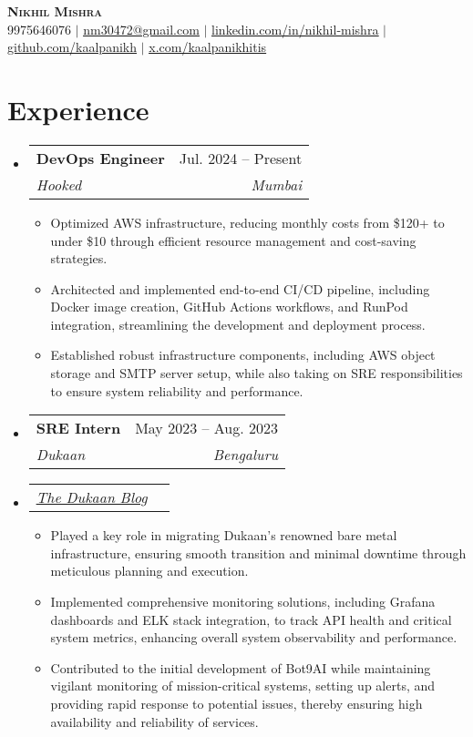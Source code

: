 \documentclass[letterpaper,11pt]{article}
\makeatletter
\newcommand{\resumeItem}[1]{
  \item\small{
    {#1 \vspace{-2pt}}
  }
}
\newcommand{\resumeSubheading}[4]{
  \vspace{-2pt}\item
    \begin{tabular*}{0.97\textwidth}[t]{l@{\extracolsep{\fill}}r}
      \textbf{#1} & #2 \\
      \textit{\small#3} & \textit{\small #4} \\
    \end{tabular*}\vspace{-7pt}
}
\newcommand{\resumeSubSubheading}[2]{
    \item
    \begin{tabular*}{0.97\textwidth}{l@{\extracolsep{\fill}}r}
      \textit{\small#1} & \textit{\small #2} \\
    \end{tabular*}\vspace{-7pt}
}
\newcommand{\resumeSubHeadingListStart}{\begin{itemize}[leftmargin=0.15in, label={}]}
\newcommand{\resumeSubHeadingListEnd}{\end{itemize}}
\newcommand{\resumeItemListStart}{\begin{itemize}}
\newcommand{\resumeItemListEnd}{\end{itemize}\vspace{-5pt}}
\makeatother
\begin{document}

\begin{center}
    \textbf{\Huge \scshape Nikhil Mishra} \\ \vspace{1pt}
    \small  9975646076 $|$ \href{mailto:nm30472@gmail.com}{\underline{nm30472@gmail.com}} $|$ 
    \href{https://linkedin.com/in/nikhil-mishra-392503306}{\underline{linkedin.com/in/nikhil-mishra}} $|$
    \href{https://github.com/kaalpanikh}{\underline{github.com/kaalpanikh}} $|$
    \href{https://x.com/kaalpanikhitis}{\underline{x.com/kaalpanikhitis}}
\end{center}

\section{Experience}
  \resumeSubHeadingListStart
    \resumeSubheading
      {DevOps Engineer}{Jul. 2024 -- Present}
      {Hooked}{Mumbai}
      \resumeItemListStart
        \resumeItem{Optimized AWS infrastructure, reducing monthly costs from \$120+ to under \$10 through efficient resource management and cost-saving strategies.}
        \resumeItem{Architected and implemented end-to-end CI/CD pipeline, including Docker image creation, GitHub Actions workflows, and RunPod integration, streamlining the development and deployment process.}
        \resumeItem{Established robust infrastructure components, including AWS object storage and SMTP server setup, while also taking on SRE responsibilities to ensure system reliability and performance.}
      \resumeItemListEnd
    
    \resumeSubheading
      {SRE Intern}{May 2023 -- Aug. 2023}
      {Dukaan}{Bengaluru}
    \resumeSubSubheading
      {\href{https://dukaan.nikhilmishra.live}{\underline{The Dukaan Blog}}}{}
      \resumeItemListStart
        \resumeItem{Played a key role in migrating Dukaan's renowned bare metal infrastructure, ensuring smooth transition and minimal downtime through meticulous planning and execution.}
        \resumeItem{Implemented comprehensive monitoring solutions, including Grafana dashboards and ELK stack integration, to track API health and critical system metrics, enhancing overall system observability and performance.}
        \resumeItem{Contributed to the initial development of Bot9AI while maintaining vigilant monitoring of mission-critical systems, setting up alerts, and providing rapid response to potential issues, thereby ensuring high availability and reliability of services.}
      \resumeItemListEnd
  \resumeSubHeadingListEnd
\end{document}
